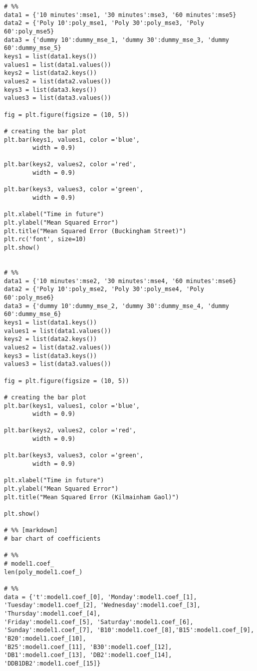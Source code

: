 \begin{verbatim}
# %%
data1 = {'10 minutes':mse1, '30 minutes':mse3, '60 minutes':mse5}
data2 = {'Poly 10':poly_mse1, 'Poly 30':poly_mse3, 'Poly 60':poly_mse5}
data3 = {'dummy 10':dummy_mse_1, 'dummy 30':dummy_mse_3, 'dummy 60':dummy_mse_5}
keys1 = list(data1.keys())
values1 = list(data1.values())
keys2 = list(data2.keys())
values2 = list(data2.values())
keys3 = list(data3.keys())
values3 = list(data3.values())
  
fig = plt.figure(figsize = (10, 5))
 
# creating the bar plot
plt.bar(keys1, values1, color ='blue',
        width = 0.9)

plt.bar(keys2, values2, color ='red',
        width = 0.9)

plt.bar(keys3, values3, color ='green',
        width = 0.9)

plt.xlabel("Time in future")
plt.ylabel("Mean Squared Error")
plt.title("Mean Squared Error (Buckingham Street)")
plt.rc('font', size=10)
plt.show()


# %%
data1 = {'10 minutes':mse2, '30 minutes':mse4, '60 minutes':mse6}
data2 = {'Poly 10':poly_mse2, 'Poly 30':poly_mse4, 'Poly 60':poly_mse6}
data3 = {'dummy 10':dummy_mse_2, 'dummy 30':dummy_mse_4, 'dummy 60':dummy_mse_6}
keys1 = list(data1.keys())
values1 = list(data1.values())
keys2 = list(data2.keys())
values2 = list(data2.values())
keys3 = list(data3.keys())
values3 = list(data3.values())
  
fig = plt.figure(figsize = (10, 5))
 
# creating the bar plot
plt.bar(keys1, values1, color ='blue',
        width = 0.9)

plt.bar(keys2, values2, color ='red',
        width = 0.9)

plt.bar(keys3, values3, color ='green',
        width = 0.9)

plt.xlabel("Time in future")
plt.ylabel("Mean Squared Error")
plt.title("Mean Squared Error (Kilmainham Gaol)")

plt.show()

# %% [markdown]
# bar chart of coefficients

# %%
# model1.coef_
len(poly_model1.coef_)

# %%
data = {'t':model1.coef_[0], 'Monday':model1.coef_[1], 'Tuesday':model1.coef_[2], 'Wednesday':model1.coef_[3], 'Thursday':model1.coef_[4],
'Friday':model1.coef_[5], 'Saturday':model1.coef_[6], 'Sunday':model1.coef_[7], 'B10':model1.coef_[8],'B15':model1.coef_[9], 'B20':model1.coef_[10],
'B25':model1.coef_[11], 'B30':model1.coef_[12], 'DB1':model1.coef_[13], 'DB2':model1.coef_[14], 'DDB1DB2':model1.coef_[15]}


\end{verbatim}
